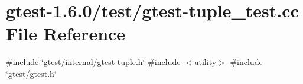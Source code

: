 \hypertarget{gtest-tuple__test_8cc}{\section{gtest-\/1.6.0/test/gtest-\/tuple\-\_\-test.cc \-File \-Reference}
\label{df/dec/gtest-tuple__test_8cc}
}
{\ttfamily \#include \char`\"{}gtest/internal/gtest-\/tuple.\-h\char`\"{}}\*
{\ttfamily \#include $<$utility$>$}\*
{\ttfamily \#include \char`\"{}gtest/gtest.\-h\char`\"{}}\*
